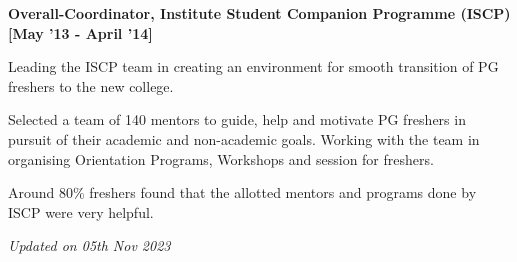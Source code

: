 \documentclass[a4paper,10pt]{article}
\begin{document}
\textbf{Overall-Coordinator, Institute Student Companion Programme (ISCP)}  \hfill {\small{{\textbf{[May '13 - April '14]}}}\/}
\begin{itemize*}
  \item Leading the ISCP team in creating an environment for smooth transition of PG freshers to the new college.
  \item Selected a team of 140 mentors to guide, help and motivate PG freshers in pursuit of their academic and non-academic goals. Working with the team in organising Orientation Programs, Workshops and session for freshers.
  \item Around 80\% freshers found that the allotted mentors and programs done by ISCP were very helpful.

\end{itemize*}





\textit{Updated on 05th Nov 2023}
\end{document}
